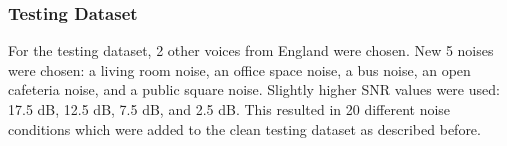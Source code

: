 \subsubsection{Testing Dataset}
For the testing dataset, 2 other voices from England were chosen. New 5 noises were chosen: a living room noise, an office space noise, a bus noise, an open cafeteria noise, and a public square noise. Slightly higher SNR values were used: 17.5 dB, 12.5 dB, 7.5 dB, and 2.5 dB. This resulted in 20 different noise conditions which were added to the clean testing dataset as described before.
